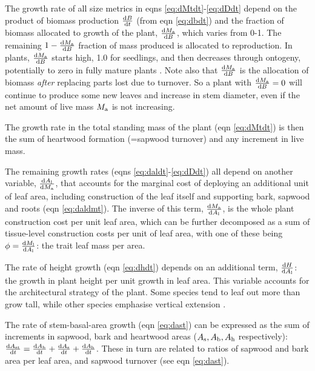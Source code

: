 \documentclass[a4paper,11pt]{article}
\begin{document}
The growth rate of all size metrics in eqns \ref{eq:dMtdt}-\ref{eq:dDdt} depend on the product of biomass production $\frac{{\rm d}B} {{\rm d}t}$ (from eqn \ref{eq:dbdt}) and the fraction of biomass allocated to growth of the plant, $\frac{{\rm d}M_{\rm a}}{{\rm d}B}$, which varies from 0-1. The remaining  $1- \frac{{\rm d}M_{\rm a}}{{\rm d}B}$ fraction of mass produced is allocated to reproduction. In plants, $\frac{{\rm d}M_{\rm a}}{{\rm d}B}$ starts high, 1.0 for seedlings, and then decreases through ontogeny, potentially to zero in fully mature plants \citep{Wenk-2015}. Note also that $\frac{{\rm d}M_{\rm a}}{{\rm d}B}$ is the allocation of biomass \emph{after} replacing parts lost due to turnover. So a plant with $\frac{{\rm d}M_{\rm a}}{{\rm d}B}=0$ will continue to produce some new leaves and increase in stem diameter, even if the net amount of live mass $M_{\rm a}$ is not increasing.

The growth rate in the total standing mass of the plant (eqn \ref{eq:dMtdt}) is then the sum of heartwood formation (=sapwood turnover) and any increment in live mass.

The remaining growth rates (eqns \ref{eq:daldt}-\ref{eq:dDdt}) all depend on another variable, $\frac{{\rm d}A_{\rm l}} {{\rm d}M_{\rm a}}$, that accounts for the marginal cost of deploying an additional unit of leaf area, including construction of the leaf itself and supporting  bark, sapwood and roots (eqn \ref{eq:daldmt}). The inverse of this term, $\frac{{\rm d}M_{\rm a} }{{\rm d}A_{\rm l}}$, is the whole plant construction cost per unit leaf area, which can be further decomposed as a sum of tissue-level construction costs per unit of leaf area, with one of these being $\phi = \frac{{\rm d}M_{\rm l} }{{\rm d}A_{\rm l}}$: the trait leaf mass per area.

The rate of height growth (eqn \ref{eq:dhdt}) depends on an additional term, $\frac{{\rm d}H }{{\rm d}A_{\rm l}}$: the growth in plant height per unit growth in leaf area. This variable accounts for the architectural strategy of the plant. Some species tend to leaf out more than grow tall, while other species emphasise vertical extension \citep{Poorter-2006}.

The rate of stem-basal-area growth (eqn \ref{eq:dast}) can be expressed as the sum of increments in sapwood, bark and heartwood areas ($A_{\rm s}, A_{\rm b}, A_{\rm h}$ respectively): $\frac{{\rm d}A_{\rm st}}{{\rm d}t}= \frac{{\rm d}A_{\rm b}}{{\rm d}t} + \frac{{\rm d}A_{\rm s}}{{\rm d}t} + \frac{{\rm d}A_{\rm h}}{{\rm d}t}$. These in turn are related to ratios of sapwood and bark area per leaf area, and sapwood turnover (see eqn \ref{eq:dast}).
\end{document}
